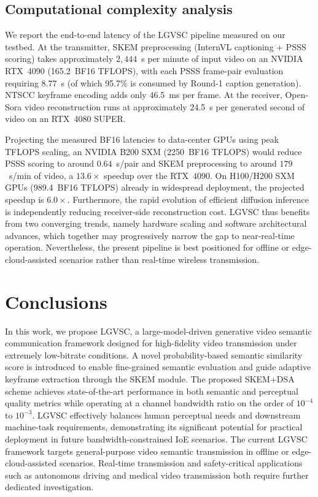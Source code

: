 \documentclass[10pt,journal]{IEEEtran}
\begin{document}
\subsection{Computational complexity analysis}
We report the end-to-end latency of the LGVSC pipeline measured on our testbed. At the transmitter, SKEM preprocessing (InternVL captioning + PSSS scoring) takes approximately $2{,}444$~s per minute of input video on an NVIDIA RTX~4090 (165.2~BF16 TFLOPS), with each PSSS frame-pair evaluation requiring $8.77$~s (of which 95.7\% is consumed by Round-1 caption generation). NTSCC keyframe encoding adds only 46.5~ms per frame. At the receiver, Open-Sora video reconstruction runs at approximately 24.5~s per generated second of video on an RTX~4080 SUPER.

Projecting the measured BF16 latencies to data-center GPUs using peak TFLOPS scaling, an NVIDIA B200 SXM (2250~BF16 TFLOPS) would reduce PSSS scoring to around $0.64$~s/pair and SKEM preprocessing to around $179$~s/min of video, a $13.6\times$ speedup over the RTX~4090. On H100/H200 SXM GPUs (989.4~BF16 TFLOPS) already in widespread deployment, the projected speedup is $6.0\times$. Furthermore, the rapid evolution of efficient diffusion inference is independently reducing receiver-side reconstruction cost. LGVSC thus benefits from two converging trends, namely hardware scaling and software architectural advances, which together {may progressively narrow the gap to near-real-time operation. Nevertheless, the present pipeline is best positioned for offline or edge-cloud-assisted scenarios rather than real-time wireless transmission}.

\section{Conclusions}



In this work, we propose LGVSC, a large-model-driven generative video semantic communication framework designed for high-fidelity video transmission under extremely low-bitrate conditions. A novel probability-based semantic similarity score is introduced to enable fine-grained semantic evaluation and guide adaptive keyframe extraction through the SKEM module. The proposed SKEM+DSA scheme achieves state-of-the-art performance in both semantic and perceptual quality metrics {while operating at a channel bandwidth ratio on the order of $10^{-4}$ to $10^{-3}$}. LGVSC effectively balances human perceptual needs and downstream machine-task requirements, demonstrating its significant potential for practical deployment in future bandwidth-constrained IoE scenarios. The current LGVSC framework targets general-purpose video semantic transmission {in offline or edge-cloud-assisted scenarios. Real-time transmission and} safety-critical applications such as autonomous driving and medical video transmission {both} require further dedicated investigation.
\end{document}
